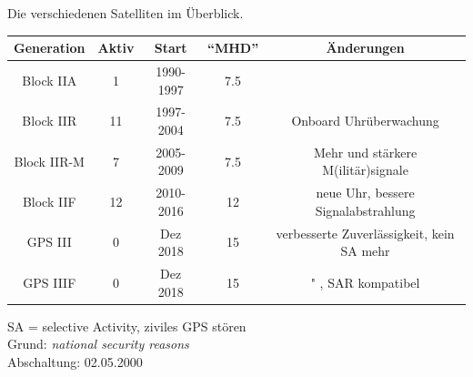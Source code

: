 \begin{frame}{Die verschiedenen Satelliten im Überblick.}
    \begin{table}
        \begin{tabular}{c S[table-format=2.0] c S[table-format=2.1] c}
            \toprule
            {Generation} & {Aktiv} & {Start} & {\enquote{MHD}} & {Änderungen} \\
            \midrule
            Block IIA   &  1 & 1990-1997 & 7.5 & \\
            Block IIR   & 11 & 1997-2004 & 7.5 & Onboard Uhrüberwachung \\
            Block IIR-M &  7 & 2005-2009 & 7.5 & Mehr und stärkere M(ilitär)signale \\
            Block IIF   & 12 & 2010-2016 & 12  & neue Uhr, bessere Signalabstrahlung \\
            GPS III     &  0 & Dez 2018  & 15  & verbesserte Zuverlässigkeit, kein SA mehr \\
            GPS IIIF    &  0 & Dez 2018  & 15  & " , SAR kompatibel \\
            \bottomrule
        \end{tabular}
    \end{table}
    SA = selective Activity, ziviles GPS stören\\
    Grund: \textit{national security reasons}\\
    Abschaltung: 02.05.2000
\end{frame}
